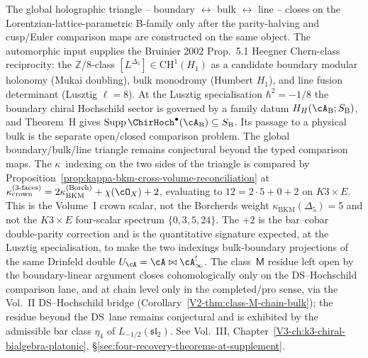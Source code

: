 \begin{remark}
\label{rem:fmhp-2}
The global holographic triangle -- boundary $\leftrightarrow$ bulk
$\leftrightarrow$ line -- closes on the Lorentzian-lattice-parametric
B-family only after the parity-halving and cusp/Euler comparison maps
are constructed on the same object. The automorphic input supplies the
Bruinier 2002 Prop.~5.1 Heegner
Chern-class reciprocity: the $\mathbb Z/8$-class $[L^{\Delta_5}]\in\mathrm{CH}^1(H_1)$
as a candidate boundary modular holonomy (Mukai doubling), bulk
monodromy (Humbert $H_1$), and line fusion determinant
(Lusztig $\ell = 8$). At the Lusztig specialisation $\hbar^2 = -1/8$
the boundary chiral Hochschild sector is governed by a family datum
$H_H(\cA_{\mathrm B};S_{\mathrm B})$, and Theorem~H gives
$\operatorname{Supp}\ChirHoch^\bullet(\cA_{\mathrm B})
\subseteq S_{\mathrm B}$.  Its passage to a physical bulk is the
separate open/closed comparison problem. The global
boundary/bulk/line triangle remains conjectural beyond the typed
comparison maps. The $\kappa$~indexing on
the two sides of
the triangle is compared by
Proposition~\ref{prop:kappa-bkm-cross-volume-reconciliation} at
$\kappa_{\mathrm{crown}}^{(3\text{-faces})}
 = 2\kappa_{\mathrm{BKM}}^{(\mathrm{Borch})} + \chi(\cO_X) + 2$,
evaluating to $12 = 2\cdot 5 + 0 + 2$ on $K3 \times E$. This is the
Volume~I crown scalar, not the Borcherds weight
$\kappa_{\mathrm{BKM}}(\Delta_5)=5$ and not the
$K3\times E$ four-scalar spectrum $\{0,3,5,24\}$. The $+2$ is the
bar--cobar double-parity correction and is the quantitative signature
expected, at the Lusztig specialisation, to make the two indexings
bulk-boundary projections of the same Drinfeld double
$U_\cA = \cA \bowtie \cA^{!}_\infty$. The class~$\mathsf{M}$ residue
left open by the boundary-linear argument closes cohomologically only
on the DS--Hochschild comparison lane, and at chain level only in the
completed/pro sense, via the Vol.~II DS--Hochschild bridge
(Corollary~\ref{V2-thm:class-M-chain-bulk}); the residue beyond the
DS~lane remains conjectural and is exhibited by the admissible bar
class $\eta_4$ of $L_{-1/2}(\mathfrak{sl}_2)$. See Vol.~III,
Chapter~\ref{V3-ch:k3-chiral-bialgebra-platonic},
\S\ref{sec:four-recovery-theorems-at-supplement}.
\end{remark}

